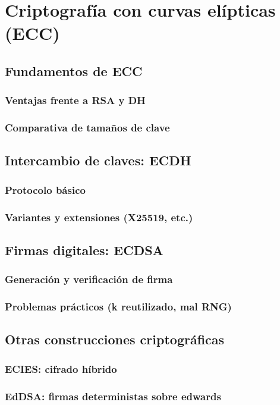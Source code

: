\chapter{Criptografía con curvas elípticas (ECC)}

\section{Fundamentos de ECC}
\subsection{Ventajas frente a RSA y DH}
\subsection{Comparativa de tamaños de clave}

\section{Intercambio de claves: ECDH}
\subsection{Protocolo básico}
\subsection{Variantes y extensiones (X25519, etc.)}

\section{Firmas digitales: ECDSA}
\subsection{Generación y verificación de firma}
\subsection{Problemas prácticos (k reutilizado, mal RNG)}

\section{Otras construcciones criptográficas}
\subsection{ECIES: cifrado híbrido}
\subsection{EdDSA: firmas deterministas sobre edwards}

